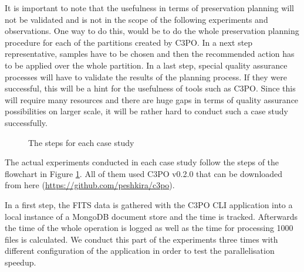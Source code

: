 It is important to note that the usefulness in terms of preservation planning will not be validated and is not in the scope of the following experiments and observations.
One way to do this, would be to do the whole preservation planning procedure for each of the partitions created by C3PO. In a next step representative, samples have to be chosen and then the recommended action has to be applied over the whole partition.
In a last step, special quality assurance processes will have to validate the results of the planning process.
If they were successful, this will be a hint for the usefulness of tools such as C3PO.
Since this will require many resources and there are huge gaps in terms of quality assurance possibilities on larger scale, it will be rather hard to conduct such a case study successfully.

\begin{figure}[tbp]
\begin{center}
\caption{The steps for each case study}
\label{fig:exp_flowchart}
\end{center}
\end{figure}

The actual experiments conducted in each case study follow the steps of the flowchart in Figure \ref{fig:exp_flowchart}.
All of them used C3PO v0.2.0 that can be downloaded from here (\url{https://github.com/peshkira/c3po}). 

In a first step, the FITS data is gathered with the C3PO CLI application into a local instance of a MongoDB document store and the time is tracked. Afterwards the time of
the whole operation is logged as well as the time for processing 1000 files is calculated. We conduct this part of the
experiments three times with different configuration of the application in order to test the parallelisation speedup.

